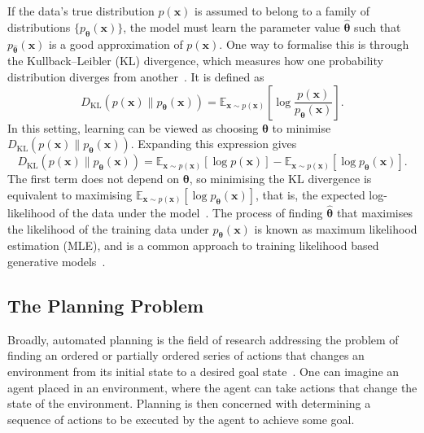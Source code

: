 ﻿\documentclass[12pt,a4paper]{article}
\let\oldcite\cite
\renewcommand{\cite}[1]{\mbox{\oldcite{#1}}}
\theoremstyle{definition}
\begin{document}
If the data's true distribution $p(\mathbf{x})$ is assumed to belong to a family of distributions
$\{p_{\boldsymbol{\theta}}(\mathbf{x})\}$, the model must learn the parameter value $\hat{\boldsymbol{\theta}}$ such that
$p_{\hat{\boldsymbol{\theta}}}(\mathbf{x})$ is a good approximation of $p(\mathbf{x})$.
One way to formalise this is through the Kullback--Leibler (KL) divergence, which measures how one
probability distribution diverges from another~\cite{goodfellow2016deep}. It is defined as
\begin{equation}
    D_{\mathrm{KL}}(p(\mathbf{x}) \| p_{\boldsymbol{\theta}}(\mathbf{x})) = \mathbb{E}_{\mathbf{x} \sim p(\mathbf{x})} \left[ \log \frac{p(\mathbf{x})}{p_{\boldsymbol{\theta}}(\mathbf{x})} \right].
\end{equation}
In this setting, learning can be viewed as choosing $\boldsymbol{\theta}$ to minimise
$D_{\mathrm{KL}}(p(\mathbf{x}) \| p_{\boldsymbol{\theta}}(\mathbf{x}))$. Expanding this expression gives
\begin{equation}
    D_{\mathrm{KL}}(p(\mathbf{x}) \| p_{\boldsymbol{\theta}}(\mathbf{x}))
    =
    \mathbb{E}_{\mathbf{x} \sim p(\mathbf{x})} [\log p(\mathbf{x})]
    -
    \mathbb{E}_{\mathbf{x} \sim p(\mathbf{x})} [\log p_{\boldsymbol{\theta}}(\mathbf{x})].
\end{equation}
The first term does not depend on $\boldsymbol{\theta}$, so minimising the KL divergence is equivalent to
maximising $\mathbb{E}_{\mathbf{x} \sim p(\mathbf{x})} [\log p_{\boldsymbol{\theta}}(\mathbf{x})]$, that is, the
expected log-likelihood of the data under the model~\cite{goodfellow2016deep}.
The process of finding $\hat{\boldsymbol{\theta}}$ that maximises the likelihood of the training data under
$p_{\boldsymbol{\theta}}(\mathbf{x})$ is known as maximum likelihood estimation (MLE), and is a common approach to
training likelihood based generative models~\cite{goodfellow2016deep}.

\subsection{The Planning Problem}
\noindent
Broadly, automated planning is the field of research addressing the problem of finding an ordered or 
partially ordered series of actions that changes an environment from its initial state to a desired goal 
state~\cite{Alarnaouti2023planning}. One can imagine an agent placed in an environment, where the agent can 
take actions that change the state of the environment. Planning is then concerned with determining a sequence of
actions to be executed by the agent to achieve some goal.
\end{document}
